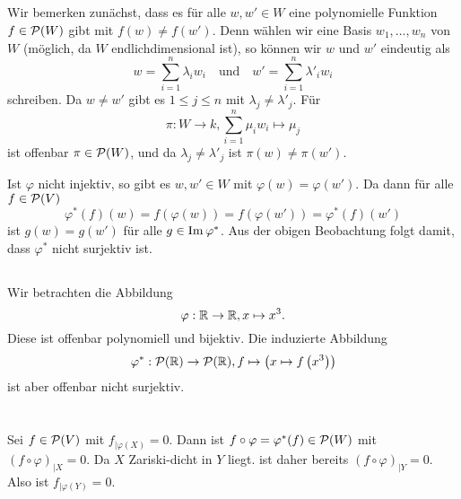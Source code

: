 \documentclass[a4paper,10pt]{article}
\begin{document}
\subsection{}
Wir bemerken zunächst, dass es für alle $w, w' \in W$ eine polynomielle Funktion $f \in \mathcal{P}(W)$ gibt mit $f(w) \neq f(w')$. Denn wählen wir eine Basis $w_1, \ldots, w_n$ von $W$ (möglich, da $W$ endlichdimensional ist), so können wir $w$ und $w'$ eindeutig als
\[
 w = \sum_{i=1}^n \lambda_i w_i \quad \text{und} \quad w' = \sum_{i=1}^n \lambda'_i w_i
\]
schreiben. Da $w \neq w'$ gibt es $1 \leq j \leq n$ mit $\lambda_j \neq \lambda'_j$. Für
\[
 \pi : W \to k, \sum_{i=1}^n \mu_i w_i \mapsto \mu_j
\]
ist offenbar $\pi \in \mathcal{P}(W)$, und da $\lambda_j \neq \lambda'_j$ ist $\pi(w) \neq \pi(w')$.

Ist $\varphi$ nicht injektiv, so gibt es $w, w' \in W$ mit $\varphi(w) = \varphi(w')$. Da dann für alle $f \in \mathcal{P}(V)$
\[
 \varphi^*(f)(w) = f(\varphi(w)) = f(\varphi(w')) = \varphi^*(f)(w')
\]
ist $g(w) = g(w')$ für alle $g \in \operatorname{Im} \varphi^*$. Aus der obigen Beobachtung folgt damit, dass $\varphi^*$ nicht surjektiv ist.


\subsection{}
Wir betrachten die Abbildung
\[
 \varphi : \mathbb{R} \to \mathbb{R}, x \mapsto x^3.
\]
Diese ist offenbar polynomiell und bijektiv. Die induzierte Abbildung
\[
 \varphi^* : \mathcal{P}(\mathbb{R}) \to \mathcal{P}(\mathbb{R}), f \mapsto \left( x \mapsto f\left(x^3\right) \right)
\]
ist aber offenbar nicht surjektiv.





\section{}
Sei $f \in \mathcal{P}(V)$ mit $f_{|\varphi(X)} = 0$. Dann ist $f \circ \varphi = \varphi^*(f) \in \mathcal{P}(W)$ mit $(f \circ \varphi)_{|X} = 0$. Da $X$ Zariski-dicht in $Y$ liegt. ist daher bereits $(f \circ \varphi)_{|Y} = 0$. Also ist $f_{|\varphi(Y)} = 0$.
\end{document}
